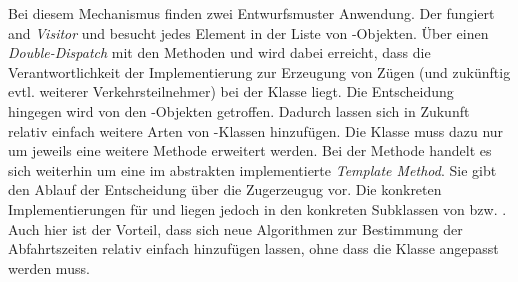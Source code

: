 Bei diesem Mechanismus finden zwei Entwurfsmuster Anwendung. Der  fungiert and \emph{Visitor} und besucht jedes Element in der Liste von -Objekten. Über einen \emph{Double-Dispatch} mit den Methoden  und  wird dabei erreicht, dass die Verantwortlichkeit der Implementierung zur Erzeugung von Zügen (und zukünftig evtl. weiterer Verkehrsteilnehmer) bei der Klasse  liegt. Die Entscheidung hingegen wird von den -Objekten getroffen. Dadurch lassen sich in Zukunft relativ einfach weitere Arten von -Klassen hinzufügen. Die Klasse  muss dazu nur um jeweils eine weitere Methode erweitert werden. Bei der Methode  handelt es sich weiterhin um eine im abstrakten  implementierte \emph{Template Method}. Sie gibt den Ablauf der Entscheidung über die Zugerzeugug vor. Die konkreten Implementierungen für  und  liegen jedoch in den konkreten Subklassen von   bzw. . Auch hier ist der Vorteil, dass sich neue Algorithmen zur Bestimmung der Abfahrtszeiten relativ einfach hinzufügen lassen, ohne dass die Klasse  angepasst werden muss.
